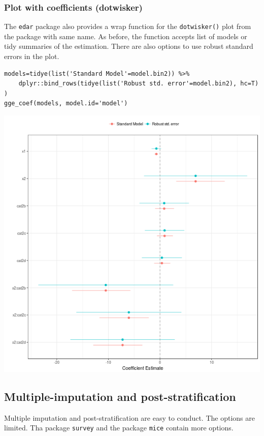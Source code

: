 \documentclass[a4paper]{article}
\begin{document}
\subsubsection{Plot with coefficients (dotwisker)}
\label{sec:orgf7824b7}
The \texttt{edar} package also provides a wrap function for the \texttt{dotwisker()} plot from the package with same name. As before, the function accepts list of models or tidy summaries of the estimation. There are also options to use robust standard errors in the plot.

\lstset{numbers=left,language=r,label= ,caption= ,captionpos=b}
\begin{lstlisting}
models=tidye(list('Standard Model'=model.bin2)) %>%
    dplyr::bind_rows(tidye(list('Robust std. error'=model.bin2), hc=T) )
gge_coef(models, model.id='model')
\end{lstlisting}

\begin{center}
\includegraphics[width=.9\linewidth]{dotwisker-1.png}
\end{center}
\subsection{Multiple-imputation and post-stratification}
\label{sec:org7c5ba43}
Multiple imputation and post-stratification are easy to conduct. The options are limited. Tha package \texttt{survey} and the package \texttt{mice} contain more options.
\end{document}
